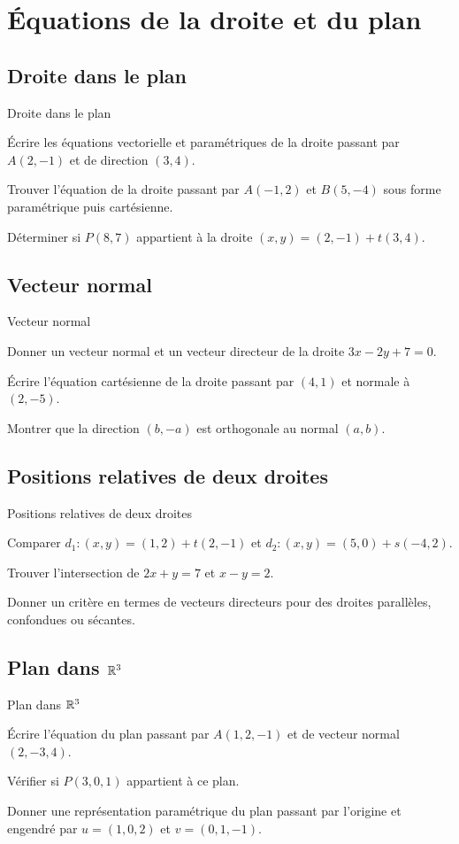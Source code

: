 \chapter{Équations de la droite et du plan}
\label{workbook:chapter:10}
\section{Droite dans le plan}
\label{workbook:section:10.01}
\begin{exerciseblock}{Droite dans le plan}
\item Écrire les équations vectorielle et paramétriques de la droite passant par $A(2,-1)$ et de direction $(3,4)$.
\item Trouver l'équation de la droite passant par $A(-1,2)$ et $B(5,-4)$ sous forme paramétrique puis cartésienne.
\item Déterminer si $P(8,7)$ appartient à la droite $(x,y)=(2,-1)+t(3,4)$.
\end{exerciseblock}
\section{Vecteur normal}
\label{workbook:section:10.02}
\begin{exerciseblock}{Vecteur normal}
\item Donner un vecteur normal et un vecteur directeur de la droite $3x-2y+7=0$.
\item Écrire l'équation cartésienne de la droite passant par $(4,1)$ et normale à $(2,-5)$.
\item Montrer que la direction $(b,-a)$ est orthogonale au normal $(a,b)$.
\end{exerciseblock}
\section{Positions relatives de deux droites}
\label{workbook:section:10.03}
\begin{exerciseblock}{Positions relatives de deux droites}
\item Comparer $d_1:(x,y)=(1,2)+t(2,-1)$ et $d_2:(x,y)=(5,0)+s(-4,2)$.
\item Trouver l'intersection de $2x+y=7$ et $x-y=2$.
\item Donner un critère en termes de vecteurs directeurs pour des droites parallèles, confondues ou sécantes.
\end{exerciseblock}
\section{Plan dans \texorpdfstring{$\mathbb{R}^3$}{R3}}
\label{workbook:section:10.04}
\begin{exerciseblock}{Plan dans \texorpdfstring{$\mathbb{R}^3$}{R3}}
\item Écrire l'équation du plan passant par $A(1,2,-1)$ et de vecteur normal $(2,-3,4)$.
\item Vérifier si $P(3,0,1)$ appartient à ce plan.
\item Donner une représentation paramétrique du plan passant par l'origine et engendré par $u=(1,0,2)$ et $v=(0,1,-1)$.
\end{exerciseblock}
